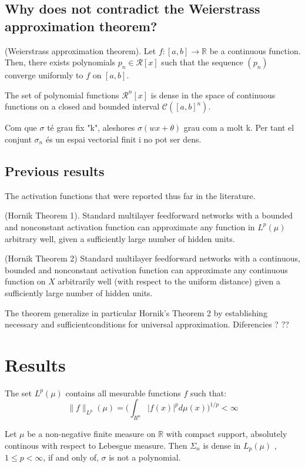 \documentclass[../main.tex]{subfiles}
\begin{document}
\subsection{Why does not contradict the Weierstrass approximation theorem? }


\begin{theorem}(Weierstrass  approximation theorem). 
	Let $f:[a,b]\rightarrow \mathbb{R} $ be a continuous function. Then, there exists polynomials $p_n\in \mathcal{R}[x]$ such that the sequence $(p_n)$ converge uniformly to $f$ on $[a,b]$. 
\end{theorem} 

\begin{corolari}
	The set of polynomial functions $\mathcal{R}^n[x]$ is dense in the space of continuous functions on a closed and bounded interval $\mathcal{C}([a,b]^n)$. 
\end{corolari}

\noindent Com que $\sigma$ té grau fix "k", aleshores $\sigma (wx+\theta) $ grau com a molt k. Per tant el conjunt $\sigma_n$ és un espai vectorial finit i no pot ser dens. 

\subsection{Previous results}
 The activation functions that were reported thus far in the literature. 
\begin{theorem} (Hornik Theorem 1). Standard multilayer feedforward networks with a bounded and nonconstant activation function can approximate any function in $L^p(\mu)$ arbitrary well, given a sufficiently large number of hidden units. 
\end{theorem}

\begin{theorem} (Hornik Theorem 2)  Standard multilayer feedforward networks with a continuous, bounded and nonconstant activation function can approximate any continuous function on $X$ arbitrarily well (with respect to the uniform distance) given a sufficiently large number of hidden units. 
\end{theorem}
The theorem generalize in particular Hornik's Theorem 2 by establishing necessary and sufficientconditions for universal approximation.
Diferencies ? ?? 
\section{Results}


\begin{definition} The set $L^{p}(\mu)$ contains all mesurable functions $f$ such that: 
	$$ \|f\|_{L^p}(\mu) = \Big( \int_{R^n} |f(x)|^p d\mu(x)\Big)^{1/p} < \infty $$

\end{definition}

\begin{propo}
Let $\mu $ be a non-negative finite measure on $\mathbb{R}$ with compact support, absolutely continous with respect to Lebesgue measure. Then $\Sigma_n$ is dense in $L_p(\mu)$ , $1\leq p < \infty$, if and only of, $\sigma$ is not a polynomial.
\end{propo}
\end{document}
